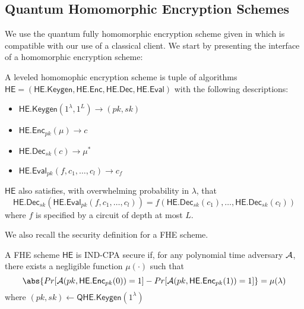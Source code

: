 \subsection{Quantum Homomorphic Encryption Schemes}


\def\QHE{\mathsf{QHE}}
\def\QGen{\mathsf{QHE.Keygen}}
\def\QEnc{\mathsf{QHE.Enc}}
\def\QEval{\mathsf{QHE.Eval}}
\def\QDec{\mathsf{QHE.Dec}}

We use the quantum fully homomorphic encryption scheme given in \cite{mahadev_qfhe} which is compatible with our use of a classical client. We start by presenting the interface of a homomorphic encryption scheme:
\begin{definition}
	A leveled homomophic encryption scheme is tuple of algorithms \linebreak $\mathsf{HE}=(\mathsf{HE.Keygen}, \mathsf{HE.Enc}, \mathsf{HE.Dec}, \mathsf{HE.Eval})$ with the following descriptions:
	\begin{itemize}
		\item $\mathsf{HE.Keygen}(1^\lambda, 1^L)\rightarrow(pk, sk)$
		\item $\mathsf{HE.Enc}_{pk}(\mu)\rightarrow c$
		\item $\mathsf{HE.Dec}_{sk}(c)\rightarrow \mu^*$
		\item $\mathsf{HE.Eval}_{pk}(f, c_1, \ldots, c_l)\rightarrow c_f$
	\end{itemize}
\end{definition}

$\mathsf{HE}$ also satisfies, with overwhelming probability in $\lambda$, that
$$\mathsf{HE.Dec}_{sk}(\mathsf{HE.Eval}_{pk}(f, c_1, \ldots, c_l))=f(\mathsf{HE.Dec}_{sk}(c_1),\ldots,\mathsf{HE.Dec}_{sk}(c_l))$$
where $f$ is specified by a circuit of depth at most $L$.


We also recall the security definition for a FHE scheme.

\begin{definition}
	A FHE scheme $\mathsf{HE}$ is IND-CPA secure if, for any polynomial time adversary $\mathcal{A}$, there exists a negligible function $\mu(\cdot)$ such that
	$$\abs{Pr[\cA(pk, \mathsf{HE.Enc}_{pk}(0))=1]-Pr[\cA(pk, \mathsf{HE.Enc}_{pk}(1))=1]}=\mu(\lambda)$$
	where $(pk, sk)\leftarrow\mathsf{QHE.Keygen}(1^\lambda)$
\end{definition}

